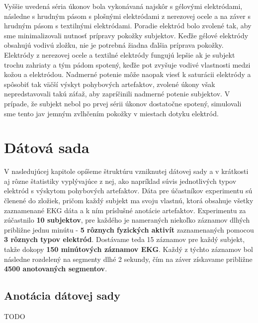 Vyššie uvedená séria úkonov bola vykonávaná najskôr s gélovými elektródami, následne s hrudným pásom s plošnými elektródami z nerezovej ocele a na záver s hrudným pásom s textilnými elektródami. Poradie elektród bolo zvolené tak, aby sme minimalizovali nutnosť prípravy pokožky subjektov. Keďže gélové elektródy obsahujú vodivú zložku, nie je potrebná žiadna ďalšia príprava pokožky. Elektródy z nerezovej ocele a textilné elektródy fungujú lepšie ak je subjekt trochu zahriaty a tým pádom spotený, keďže pot zvyšuje vodivé vlastnosti medzi kožou a elektródou. Nadmerné potenie môže naopak viesť k saturácii elektródy a spôsobiť tak väčší výskyt pohybových artefaktov, zvolené úkony však nepredstavovali takú záťaž, aby zapríčinili nadmerné potenie subjektov. V prípade, že subjekt nebol po prvej sérii úkonov dostatočne spotený, simulovali sme tento jav jemným zvlhčením pokožky v miestach dotyku elektród.



\chapter{Dátová sada}

V nasledujúcej kapitole opíšeme štruktúru vzniknutej dátovej sady a v krátkosti aj rôzne štatistiky vyplývajúce z nej, ako napríklad súvis jednotlivých typov elektród s výskytom pohybových artefaktov. Dáta pre účastníkov experimentu sú členené do zložiek, pričom každý subjekt ma svoju vlastnú, ktorá obsahuje všetky zaznamenané EKG dáta a k ním príslušné anotácie artefaktov. Experimentu za zúčastnilo \textbf{10 subjektov}, pre každého je nameraných niekoľko záznamov dlhých približne jednu minútu - \textbf{5 rôznych fyzických aktivít} zaznamenaných pomocou \textbf{3 rôznych typov elektród}. Dostávame teda 15 záznamov pre každý subjekt, takže dokopy \textbf{150 minútových záznamov EKG}. Každý z týchto záznamov bol následne rozdelený na segmenty dlhé 2 sekundy, čím na záver získavame približne \textbf{4500 anotovaných segmentov}.

\section{Anotácia dátovej sady}

TODO


